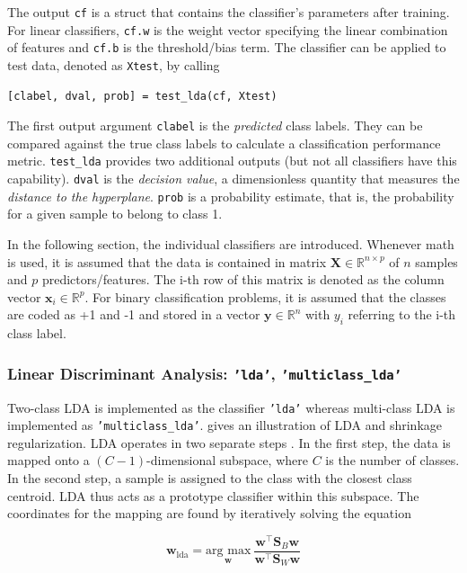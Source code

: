 \documentclass[utf8]{frontiersSCNS} %
\newcommand{\w}{\mathbf{w}}
\newcommand{\x}{\mathbf{x}}
\newcommand{\R}{\mathbb{R}}
\renewcommand{\S}{\mathbf{S}}
\newcommand{\X}{\mathbf{X}}
\newcommand{\ttt}[1]{\texttt{#1}}
\begin{document}
The output \ttt{cf} is a struct that contains the classifier's parameters after training. For linear classifiers, \ttt{cf.w} is the weight vector specifying the linear combination of features and \ttt{cf.b} is the threshold/bias term. The classifier can be applied to test data, denoted as \ttt{Xtest}, by calling

\begin{verbatim}
[clabel, dval, prob] = test_lda(cf, Xtest)
\end{verbatim}

The first output argument \ttt{clabel} is the \textit{predicted} class labels. They can be compared against the true class labels to calculate a classification performance metric. \ttt{test\_lda} provides two additional outputs (but not all classifiers have this capability). \ttt{dval} is the \textit{decision value}, a dimensionless quantity that measures the \textit{distance to the hyperplane}. \ttt{prob} is a probability estimate, that is, the probability for a given sample to belong to class 1. 

In the following section, the individual classifiers are introduced. Whenever math is used, it is assumed that the data is contained in matrix $\X\in\R^{n \times p}$ of $n$ samples and $p$ predictors/features. The i-th row of this matrix is denoted as the column vector $\x_i\in\R^p$. For binary classification problems, it is assumed that the classes are coded as +1 and -1 and stored in a vector $\mathbf{y}\in\R^n$ with $y_i$ referring to the i-th class label.

\subsubsection{Linear Discriminant Analysis: \ttt{'lda'}, \ttt{'multiclass\_lda'}}

Two-class LDA is implemented as the classifier \ttt{'lda'} whereas multi-class LDA is implemented as \texttt{'multiclass\_lda'}.  gives an illustration of LDA and shrinkage regularization. LDA operates in two separate steps \citep{Fisher1936}. In the first step, the data is mapped onto a $(C-1)$-dimensional subspace, where $C$ is the number of classes. In the second step, a sample is assigned to the class with the closest class centroid. LDA thus acts as a prototype classifier within this subspace. The coordinates for the mapping are found by iteratively solving the equation

\begin{equation}
\label{eq:fda}
\w_{\text{lda}} = \underset{\w}{\text{arg max}}\ \frac{\w^\top \S_B\w}{\w^\top \S_W\w}
\end{equation}
\end{document}
